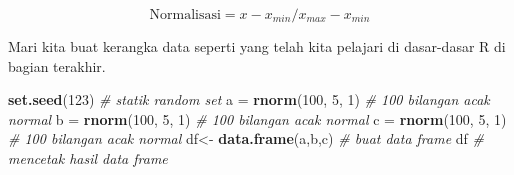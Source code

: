 \documentclass[
]{book}
\newenvironment{Shaded}{\begin{snugshade}}{\end{snugshade}}
\newcommand{\CommentTok}[1]{\textcolor[rgb]{0.56,0.35,0.01}{\textit{#1}}}
\newcommand{\DecValTok}[1]{\textcolor[rgb]{0.00,0.00,0.81}{#1}}
\newcommand{\FunctionTok}[1]{\textcolor[rgb]{0.13,0.29,0.53}{\textbf{#1}}}
\newcommand{\NormalTok}[1]{#1}
\newcommand{\OtherTok}[1]{\textcolor[rgb]{0.56,0.35,0.01}{#1}}
\begin{document}
\[\text{Normalisasi}={x-x_{min} / x_{max} - x_{min}}\]

Mari kita buat kerangka data seperti yang telah kita pelajari di dasar-dasar R di bagian terakhir.

\begin{Shaded}
\begin{Highlighting}[]
\FunctionTok{set.seed}\NormalTok{(}\DecValTok{123}\NormalTok{)                                }\CommentTok{\# statik random set}
\NormalTok{a }\OtherTok{=} \FunctionTok{rnorm}\NormalTok{(}\DecValTok{100}\NormalTok{, }\DecValTok{5}\NormalTok{, }\DecValTok{1}\NormalTok{)                         }\CommentTok{\# 100 bilangan acak normal}
\NormalTok{b }\OtherTok{=} \FunctionTok{rnorm}\NormalTok{(}\DecValTok{100}\NormalTok{, }\DecValTok{5}\NormalTok{, }\DecValTok{1}\NormalTok{)                         }\CommentTok{\# 100 bilangan acak normal}
\NormalTok{c }\OtherTok{=} \FunctionTok{rnorm}\NormalTok{(}\DecValTok{100}\NormalTok{, }\DecValTok{5}\NormalTok{, }\DecValTok{1}\NormalTok{)                         }\CommentTok{\# 100 bilangan acak normal}
\NormalTok{df}\OtherTok{\textless{}{-}} \FunctionTok{data.frame}\NormalTok{(a,b,c)                       }\CommentTok{\# buat data frame}
\NormalTok{df                                           }\CommentTok{\# mencetak hasil data frame}
\end{Highlighting}
\end{Shaded}
\end{document}
